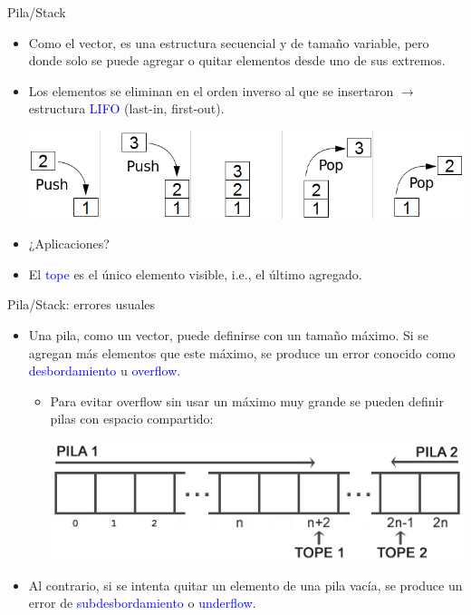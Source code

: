 \documentclass{beamer} %
\newcommand{\blue}[1]{\textcolor{blue}{#1}}
\begin{document}
\begin{frame}{Pila/Stack}
    \begin{itemize}
        \item<1-> Como el vector, es una estructura secuencial y de tamaño variable, pero donde solo se puede agregar o quitar elementos desde uno de sus extremos.
        \item<2-> Los elementos se eliminan en el orden inverso al que se insertaron $\to$ estructura \blue{LIFO} (last-in, first-out).
        \smallskip
        
        \begin{center}
            \includegraphics[width=.8\textwidth]{./image/cap2/stack.png}
        \end{center}
        \item<3-> ¿Aplicaciones? 
        \item<5-> El \blue{tope} es el único elemento visible, i.e., el último agregado.
    \end{itemize}
\end{frame}

\begin{frame}{Pila/Stack: errores usuales}
    \begin{itemize}
        \item<1-> Una pila, como un vector, puede definirse con un tamaño máximo. Si se agregan más elementos que este máximo, se produce un error conocido como \blue{desbordamiento} u \blue{overflow}.
        \begin{itemize}
            \item<2-> Para evitar overflow sin usar un máximo muy grande se pueden definir pilas con espacio compartido:\\[1.5ex]
            \begin{center}
                \includegraphics[width=.8\textwidth]{./image/cap2/stacks-sharing.png}
            \end{center}
        \end{itemize}
        \item<3-> Al contrario, si se intenta quitar un elemento de una pila vacía, se produce un error de \blue{subdesbordamiento} o \blue{underflow}.
    \end{itemize}
\end{frame}
\end{document}
